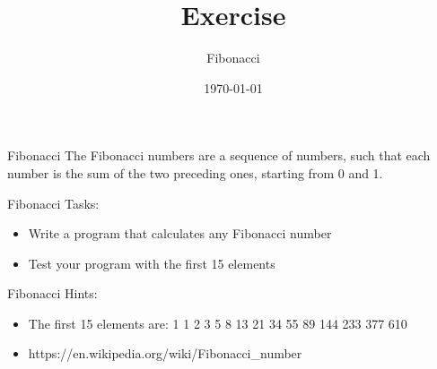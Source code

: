 


\title{Exercise}
\subtitle{Fibonacci}
\date{\today}




\begin{frame}
    \titlepage
\end{frame}

\begin{frame}{Fibonacci}
    The Fibonacci numbers are a sequence of numbers, such that each number is the sum of the two preceding ones, starting from 0 and 1.
\end{frame}

\begin{frame}{Fibonacci}
    Tasks:
    \begin{itemize}
        \item Write a program that calculates any Fibonacci number
        \item Test your program with the first 15 elements
    \end{itemize}
\end{frame}

\begin{frame}{Fibonacci}
    Hints:
    \begin{itemize}
        \item The first 15 elements are: 1 1 2 3 5 8 13 21 34 55 89 144 233 377 610
        \item https://en.wikipedia.org/wiki/Fibonacci_number
    \end{itemize}
\end{frame}



